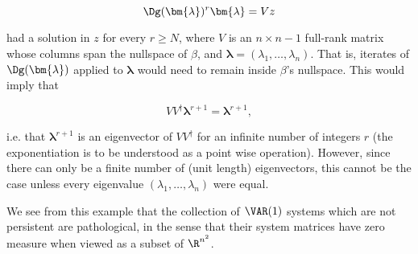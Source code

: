 \begin{example}
  \begin{equation*}
    \Dg(\bm{\lambda})^r \bm{\lambda} = Vz
  \end{equation*}

  had a solution in $z$ for every $r \ge N$, where $V$ is an
  $n \times n - 1$ full-rank matrix whose columns span the nullspace of $\beta$,
  and $\bm{\lambda} = (\lambda_1, \ldots, \lambda_n)$. That is,
  iterates of $\Dg(\bm{\lambda})$ applied to $\bm{\lambda}$ would need to remain
  inside $\beta$'s nullspace.  This would imply that

  \begin{equation*}
    VV^\dagger \bm{\lambda}^{r + 1} = \bm{\lambda}^{r + 1},
  \end{equation*}

  i.e. that $\bm{\lambda}^{r + 1}$ is an eigenvector of $VV^\dagger$
  for an infinite number of integers $r$ (the exponentiation is to be
  understood as a point wise operation).  However, since there can only
  be a finite number of (unit length) eigenvectors, this cannot be the
  case unless every eigenvalue $(\lambda_1, \ldots, \lambda_n)$ were
  equal.

  We see from this example that the collection of $\VAR(1)$ systems
  which are not persistent are pathological, in the sense that their
  system matrices have zero measure when viewed as a subset of $\R^{n^2}$.
\end{example}

